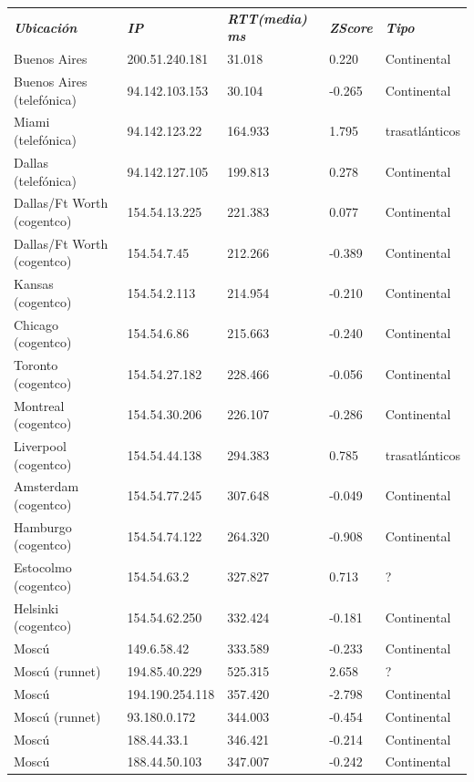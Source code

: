 \begin{tabular}{lllll}

	\textit{\textbf{Ubicaci\'on}}	&	\textit{\textbf{IP}}	&	\textit{\textbf{RTT(media) ms}}	&	\textit{\textbf{ZScore}}	&	\textit{\textbf{Tipo}}	\\
	Buenos Aires	&	200.51.240.181	&	31.018	&	0.220	&	Continental	\\
	Buenos Aires (telef\'onica)	&	94.142.103.153	&	30.104	&	-0.265	&	Continental	\\
	Miami (telef\'onica)		&	94.142.123.22	&	164.933	&	1.795	&	trasatl\'anticos	\\
	Dallas (telef\'onica)		&	94.142.127.105	&	199.813	&	0.278	&	Continental	\\
	Dallas/Ft Worth (cogentco)	&	154.54.13.225	&	221.383	&	0.077	&	Continental	\\
	Dallas/Ft Worth (cogentco)	&	154.54.7.45	&	212.266	&	-0.389	&	Continental	\\
	Kansas (cogentco)		&	154.54.2.113	&	214.954	&	-0.210	&	Continental	\\
	Chicago (cogentco)		&	154.54.6.86	&	215.663	&	-0.240	&	Continental	\\
	Toronto (cogentco)		&	154.54.27.182	&	228.466	&	-0.056	&	Continental	\\
	Montreal (cogentco)	&	154.54.30.206	&	226.107	&	-0.286	&	Continental	\\
	Liverpool (cogentco)	&	154.54.44.138	&	294.383	&	0.785	&	trasatl\'anticos	\\
	Amsterdam (cogentco)	&	154.54.77.245	&	307.648	&	-0.049	&	Continental	\\
	Hamburgo (cogentco)	&	154.54.74.122	&	264.320	&	-0.908	&	Continental	\\
	Estocolmo (cogentco)	&	154.54.63.2	&	327.827	&	0.713	&	?	\\
	Helsinki (cogentco)		&	154.54.62.250	&	332.424	&	-0.181	&	Continental	\\
	Mosc\'u			&	149.6.58.42	&	333.589	&	-0.233	&	Continental	\\
	Mosc\'u (runnet)		&	194.85.40.229	&	525.315	&	2.658	&	?	\\
	Mosc\'u 			&	194.190.254.118	&	357.420	&	-2.798	&	Continental	\\
	Mosc\'u (runnet)		&	93.180.0.172	&	344.003	&	-0.454	&	Continental	\\
	Mosc\'u			&	188.44.33.1	&	346.421	&	-0.214	&	Continental	\\ 	
	Mosc\'u			&	188.44.50.103	&	347.007	&	-0.242	&	Continental	\\	

\end{tabular}


